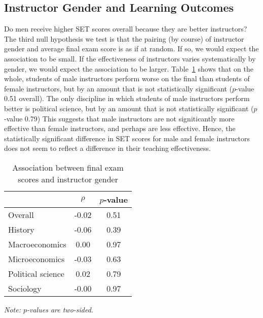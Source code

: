 \documentclass[12pt]{article}
\begin{document}
\subsection{Instructor Gender and Learning Outcomes}
Do men receive higher SET scores overall because they are better instructors? 
The third null hypothesis we test is that the pairing (by course) of instructor gender and
average final exam score is as if at random.
If so, we would expect the association to be small.
If the effectiveness of instructors varies systematically by gender,
we would expect the association to be larger. 
Table~\ref{tab:genderfinal} shows that on the whole, students of male instructors
perform worse on the final than students of female instructors, but by an amount that is
not statistically significant ($p$-value 0.51 overall).
The only discipline in which students of male instructors perform better is political science,
but by an amount that is not statistically significant ($p$-value 0.79)
This suggests that male instructors are not signiticantly more effective than female instructors, 
and perhaps are less effective. 
Hence, the statistically significant difference in SET scores for male and female instructors
does not seem to reflect a difference in their teaching effectiveness.


\begin{table}[htbp]
  \centering
  \footnotesize 
  \caption{Association between final exam scores and instructor gender}
    \begin{tabular}{lcc}
    \toprule 
                     & $\rho$  & $p$-value    \\
   \midrule
    Overall &            -0.02       & 0.51      \\
    History &            -0.06       & 0.39      \\
    Macroeconomics &      0.00       & 0.97      \\
    Microeconomics &     -0.03       & 0.63      \\
    Political science &  0.02       & 0.79      \\
    Sociology &          -0.00       & 0.97      \\
    \bottomrule
    \end{tabular}%
 \label{tab:genderfinal}%
 
  \textit{Note: $p$-values are two-sided.}
\end{table}%
\normalsize
\end{document}
